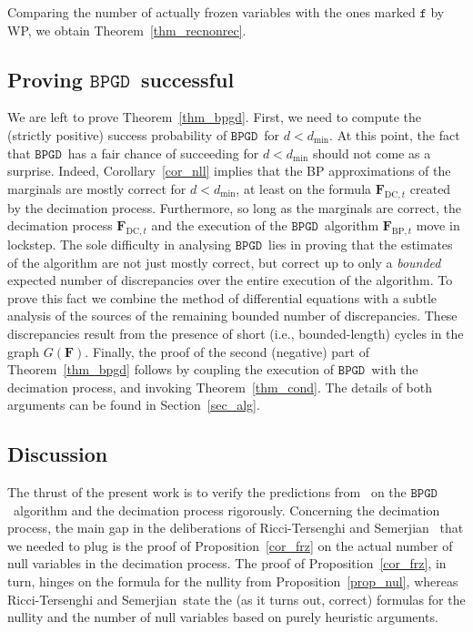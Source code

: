 \documentclass[10pt,reqno]{amsart}
\numberwithin{equation}{section}
\newcommand{\RTS}{Ricci-Tersenghi and Semerjian}
\renewcommand{\vec}[1]{\boldsymbol{#1}}
\newcommand\dmin{d_{\mathrm{min}}}
\newcommand{\FBP}[1]{\PHI_{\mathrm{BP},{#1}}}
\newcommand{\FDC}[1]{\PHI_{\mathrm{DC},{#1}}}
\newcommand{\frozen}{\mathtt{f}}
\newcommand{\fzn}{\frozen}
\newcommand{\BPGD}{\ensuremath{\mathtt{BPGD}}}
\newcommand\PHI{\vec F}
\newcommand\Prop{Proposition}
\newcommand\Thm{Theorem}
\newcommand\Cor{Corollary}
\newcommand\Sec{Section}
\begin{document}
\noindent
Comparing the number of actually frozen variables with the ones marked $\fzn$ by WP, we obtain \Thm~\ref{thm_recnonrec}.

\subsection{Proving \BPGD\ successful}\label{sec_bpgd_success}
We are left to prove \Thm~\ref{thm_bpgd}.
First, we need to compute the (strictly positive) success probability of \BPGD\ for $d<\dmin$.
At this point, the fact that \BPGD\ has a fair chance of succeeding for $d<\dmin$ should not come as a surprise.
Indeed, \Cor~\ref{cor_nll} implies that the BP approximations of the marginals are mostly correct for $d<\dmin$, at least on the formula $\FDC t$ created by the decimation process.
Furthermore, so long as the marginals are correct, the decimation process $\FDC{t}$ and the execution of the \BPGD\ algorithm $\FBP{t}$ move in lockstep.
The sole difficulty in analysing \BPGD\ lies in proving that the estimates of the algorithm are not just mostly correct, but correct up to only a {\em bounded} expected number of discrepancies over the entire execution of the algorithm.
To prove this fact we combine the method of differential equations with a subtle analysis of the sources of the remaining bounded number of discrepancies.
These discrepancies result from the presence of short (i.e., bounded-length) cycles in the graph $G(\PHI)$.
Finally, the proof of the second (negative) part of \Thm~\ref{thm_bpgd} follows by coupling the execution of \BPGD\ with the decimation process, and invoking \Thm~\ref{thm_cond}.
The details of both arguments can be found in \Sec~\ref{sec_alg}.

\subsection{Discussion}\label{sec_discussion}
The thrust of the present work is to verify the predictions from~\cite{RTS} on the \BPGD\ algorithm and the decimation process rigorously.
Concerning the decimation process, the main gap in the deliberations of \RTS\ \cite{RTS} that we needed to plug is the proof of \Prop~\ref{cor_frz} on the actual number of null variables in the decimation process.
The proof of \Prop~\ref{cor_frz}, in turn, hinges on the formula for the nullity from \Prop~\ref{prop_nul}, whereas \RTS\ state the (as it turns out, correct) formulas for the nullity and the number of null variables based on purely heuristic arguments.
\end{document}

